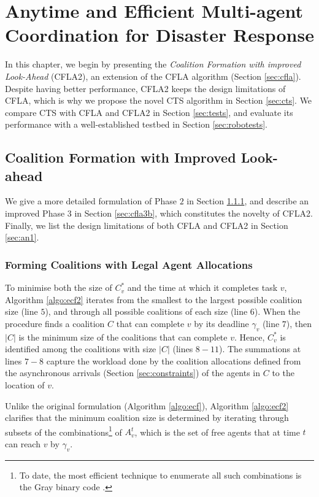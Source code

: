 \chapter{Anytime and Efficient Multi-agent Coordination for Disaster Response}\label{chap:contrib1}

In this chapter, we begin by presenting the \emph{Coalition Formation with improved
Look-Ahead} (CFLA2), an extension of the CFLA algorithm (Section \ref{sec:cfla}). Despite
having better performance, CFLA2 keeps the design limitations of CFLA, which is why we
propose the novel CTS algorithm in Section \ref{sec:cts}. We compare CTS with CFLA and
CFLA2 in Section \ref{sec:tests}, and evaluate its performance with a well-established
testbed in Section \ref{sec:robotests}.

\section{Coalition Formation with Improved Look-ahead}

We give a more detailed formulation of Phase $2$ in Section \ref{sec:cfla2b}, and describe
an improved Phase $3$ in Section \ref{sec:cfla3b}, which constitutes the novelty of CFLA2.
Finally, we list the design limitations of both CFLA and CFLA2 in Section \ref{sec:an1}.

\subsection{Forming Coalitions with Legal Agent Allocations}\label{sec:cfla2b}

To minimise both the size of $C^*_v$ and the time at which it completes task $v$,
Algorithm \ref{algo:ecf2} iterates from the smallest to the largest possible coalition
size (line $5$), and through all possible coalitions of each size (line $6$). When the
procedure finds a coalition $C$ that can complete $v$ by its deadline $\gamma_v$ (line $7$),
then $|C|$ is the minimum size of the coalitions that can complete $v$. Hence, $C^*_v$ is
identified among the coalitions with size $|C|$ (lines $8 - 11$). The summations at
lines $7 - 8$ capture the workload done by the coalition allocations defined from the
asynchronous arrivals (Section \ref{sec:constraints}) of the agents in $C$ to the location
of $v$.
\clearpage

Unlike the original formulation (Algorithm \ref{algo:ecf}), Algorithm \ref{algo:ecf2}
clarifies that the minimum coalition size is determined by iterating through
subsets of the combinations\footnote{To date, the most efficient technique to enumerate
all such combinations is the Gray binary code \cite[Section $7.2.1.1$]{knuth2005}.} of
$A^t_v$, which is the set of free agents that at time $t$ can reach $v$ by $\gamma_v$.

